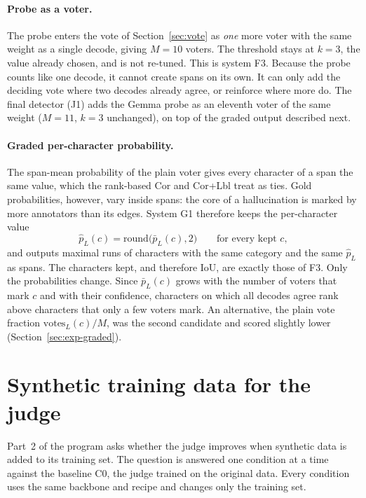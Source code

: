 \paragraph{Probe as a voter.}
The probe enters the vote of Section~\ref{sec:vote} as \emph{one} more voter with the same weight as a single decode, giving $M = 10$ voters. The threshold stays at $k = 3$, the value already chosen, and is not re-tuned. This is system F3. Because the probe counts like one decode, it cannot create spans on its own. It can only add the deciding vote where two decodes already agree, or reinforce where more do. The final detector (J1) adds the Gemma probe as an eleventh voter of the same weight ($M = 11$, $k = 3$ unchanged), on top of the graded output described next.

\paragraph{Graded per-character probability.}
The span-mean probability of the plain voter gives every character of a span the same value, which the rank-based Cor and Cor+Lbl treat as ties. Gold probabilities, however, vary inside spans: the core of a hallucination is marked by more annotators than its edges. System G1 therefore keeps the per-character value
\begin{equation}
    \hat p_L(c) = \mathrm{round}\big(\bar p_L(c), 2\big) \qquad \text{for every kept } c,
    \label{eq:graded}
\end{equation}
and outputs maximal runs of characters with the same category and the same $\hat p_L$ as spans. The characters kept, and therefore IoU, are exactly those of F3. Only the probabilities change. Since $\bar p_L(c)$ grows with the number of voters that mark $c$ and with their confidence, characters on which all decodes agree rank above characters that only a few voters mark. An alternative, the plain vote fraction $\mathrm{votes}_L(c)/M$, was the second candidate and scored slightly lower (Section~\ref{sec:exp-graded}).

\section{Synthetic training data for the judge}\label{sec:synth}

Part~2 of the program asks whether the judge improves when synthetic data is added to its training set. The question is answered one condition at a time against the baseline C0, the judge trained on the original data. Every condition uses the same backbone and recipe and changes only the training set.

